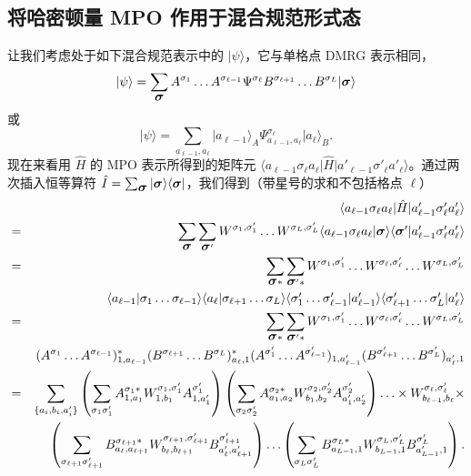 \documentclass[a4paper,10pt,oneside,onecolumn,1p,times]{elsarticle}
\newcommand{\bra}[1]{\mbox{$\langle #1  |$}}
\newcommand{\ket}[1]{\mbox{$| #1  \rangle$}}
\newcommand{\braket}[2]{\mbox{$\langle #1  | #2 \rangle$}} 	%
\newcommand{\fat}[1]{\mbox{\boldmath$#1$\unboldmath}}	%
\begin{document}
\subsection{将哈密顿量 MPO 作用于混合规范形式态}
\label{subsec:Hamiltonianmixedcanonical}
让我们考虑处于如下混合规范表示中的 $\ket{\psi}$，它与单格点 DMRG 表示相同，
\begin{equation}
\ket{\psi} = \sum_{\fat{\sigma}} A^{\sigma_1} \ldots A^{\sigma_{\ell-1}} \Psi^{\sigma_{\ell}} B^{\sigma_{\ell+1}} \ldots B^{\sigma_L} \ket{\fat{\sigma}} 
\end{equation}
或
\begin{equation}
\ket{\psi} = \sum_{a_{\ell-1},a_{\ell}} \ket{a_{\ell-1}}_A \Psi^{\sigma_{\ell}}_{a_{\ell-1}, a_{\ell}} \ket{a_{\ell}}_B .
\end{equation}
现在来看用 $\hat{H}$ 的 MPO 表示所得到的矩阵元 $\bra{a_{\ell-1} \sigma_{\ell} a_{\ell}} \hat{H}  \ket{a'_{\ell-1} \sigma'_{\ell} a'_{\ell}}$。通过两次插入恒等算符 $\hat{I} = \sum_{\fat{\sigma}} \ket{\fat{\sigma}}\bra{\fat{\sigma}}$，我们得到（带星号的求和不包括格点 $\ell$）
\begin{eqnarray*}
& & \bra{a_{\ell-1} \sigma_{\ell} a_{\ell}} \hat{H}  \ket{a'_{\ell-1} \sigma'_{\ell} a'_{\ell}} \\
&=& \sum_{\fat{\sigma}} \sum_{\fat{\sigma}'} W^{\sigma_1,\sigma'_1} \ldots W^{\sigma_L,\sigma'_L} 
\braket{a_{\ell-1} \sigma_{\ell} a_{\ell}}{\fat{\sigma}} \braket{\fat{\sigma}'}{a'_{\ell-1} \sigma'_{\ell} a'_{\ell}} \\
&=& \sum_{\fat{\sigma}*}\sum_{\fat{\sigma}'*} W^{\sigma_1,\sigma'_1} \ldots W^{\sigma_{\ell},\sigma'_{\ell}} \ldots W^{\sigma_L,\sigma'_L} \\
& & \braket{a_{\ell-1}}{\sigma_1 \ldots \sigma_{\ell-1}} 
\braket{a_{\ell}}{\sigma_{\ell+1} \ldots \sigma_L}  \braket{\sigma'_1 \ldots \sigma'_{\ell-1}}{a'_{\ell-1}}
\braket{\sigma'_{\ell+1} \ldots \sigma'_L}{a'_{\ell}} \\
&=& \sum_{\fat{\sigma}*}\sum_{\fat{\sigma}'*} W^{\sigma_1,\sigma'_1} \ldots W^{\sigma_{\ell},\sigma'_{\ell}} \ldots W^{\sigma_L,\sigma'_L} \\
& & (A^{\sigma_1} \ldots A^{\sigma_{\ell-1}})^*_{1,a_{\ell-1}} (B^{\sigma_{\ell+1}} \ldots B^{\sigma_L})^*_{a_{\ell},1} (A^{\sigma'_1} \ldots A^{\sigma'_{\ell-1}})_{1,a'_{\ell-1}} (B^{\sigma'_{\ell+1}} \ldots B^{\sigma'_L})_{a'_{\ell},1} \\
&=& \sum_{\{ a_i, b_i, a'_i\} } \left( \sum_{\sigma_1\sigma'_1} A^{\sigma_1*}_{1,a_1} W^{\sigma_1,\sigma'_1}_{1,b_1} A^{\sigma'_1}_{1,a'_1} \right) \left( \sum_{\sigma_2\sigma'_2} A^{\sigma_2*}_{a_1,a_2} W^{\sigma_2,\sigma'_2}_{b_1,b_2} A^{\sigma'_2}_{a'_1,a'_2} \right) \ldots 
\times W^{\sigma_{\ell},\sigma'_{\ell}}_{b_{\ell-1},b_{\ell}} \times \\
& &  \left( \sum_{\sigma_{\ell+1}\sigma'_{\ell+1}} B^{\sigma_{\ell+1}*}_{a_{\ell},a_{\ell+1}} W^{\sigma_{\ell+1},\sigma'_{\ell+1}}_{b_{\ell},b_{\ell+1}} B^{\sigma'_{\ell+1}}_{a'_{\ell},a'_{\ell+1}} \right) \ldots \left( \sum_{\sigma_L\sigma'_L} B^{\sigma_L*}_{a_{L-1},1} W^{\sigma_L,\sigma'_L}_{b_{L-1},1} B^{\sigma'_L}_{a'_{L-1},1} \right) .
\end{eqnarray*}   
\end{document}
